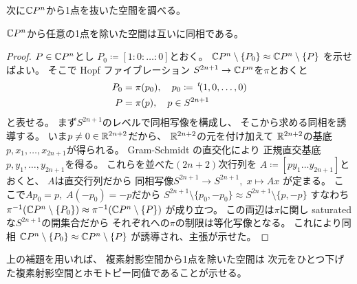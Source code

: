 \documentclass[report]{jlreq}
\begin{document}
次に$\mathbb{C} P^n$から1点を抜いた空間を調べる。

\begin{lemma}
    $\mathbb{C} P^{n}$から任意の1点を除いた空間は互いに同相である。
\end{lemma}

\begin{proof}
    $P \in \mathbb{C} P^{n}$とし
    $P_0 \coloneqq [1 : 0 : \dots : 0]$とおく。
    $\mathbb{C} P^{n} \setminus \{ P_0 \} \approx \mathbb{C} P^{n} \setminus \{ P \}$
    を示せばよい。
    そこで Hopf ファイブレーション
    $S^{2n + 1} \to \mathbb{C} P^n$を$\pi$とおくと
    \begin{alignat}{1}
        P_0 &= \pi(p_0), \quad p_0 \coloneqq \,{}^{t}\!(1, 0, \dots, 0) \\
        P &= \pi(p), \quad p \in S^{2n + 1}
    \end{alignat}
    と表せる。
    まず$S^{2n + 1}$のレベルで同相写像を構成し、
    そこから求める同相を誘導する。
    いま$p \neq 0 \in \mathbb{R}^{2n + 2}$だから、
    $\mathbb{R}^{2n + 2}$の元を付け加えて
    $\mathbb{R}^{2n + 2}$の基底$p, x_1, \dots, x_{2n + 1}$が得られる。
    Gram-Schmidt の直交化により
    正規直交基底$p, y_1, \dots, y_{2n + 1}$を得る。
    これらを並べた$(2n + 2)$次行列を
    $A \coloneqq [p y_1 \dots y_{2n + 1}]$とおくと、
    $A$は直交行列だから
    同相写像$S^{2n + 1} \to S^{2n + 1}, \; x \mapsto Ax$
    が定まる。
    ここで$Ap_0 = p, \; A(-p_0) = -p$だから
    $S^{2n + 1} \setminus \{ p_0, -p_0 \}
        \approx S^{2n + 1} \setminus \{ p, -p \}$
    すなわち
    $\pi^{-1}(\mathbb{C} P^n \setminus \{ P_0 \})
        \approx \pi^{-1}(\mathbb{C} P^n \setminus \{ P \})$
    が成り立つ。
    この両辺は$\pi$に関し saturated な$S^{2n + 1}$の開集合だから
    それぞれへの$\pi$の制限は等化写像となる。
    これにより同相
    $\mathbb{C} P^{n} \setminus \{ P_0 \} \approx \mathbb{C} P^{n} \setminus \{ P \}$
    が誘導され、主張が示せた。
\end{proof}

上の補題を用いれば、
複素射影空間から1点を除いた空間は
次元をひとつ下げた複素射影空間とホモトピー同値であることが示せる。

\end{document}
